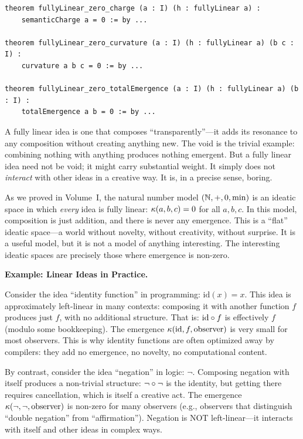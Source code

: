 \begin{lstlisting}[caption={Fully linear consequences (IDT\_v3\_Emergence.lean)}]
theorem fullyLinear_zero_charge (a : I) (h : fullyLinear a) :
    semanticCharge a = 0 := by ...

theorem fullyLinear_zero_curvature (a : I) (h : fullyLinear a) (b c : I) :
    curvature a b c = 0 := by ...

theorem fullyLinear_zero_totalEmergence (a : I) (h : fullyLinear a) (b : I) :
    totalEmergence a b = 0 := by ...
\end{lstlisting}

\begin{interpretation}
A fully linear idea is one that composes ``transparently''---it adds its resonance
to any composition without creating anything new. The void is the trivial example:
combining nothing with anything produces nothing emergent. But a fully linear idea
need not be void; it might carry substantial weight. It simply does not \emph{interact}
with other ideas in a creative way. It is, in a precise sense, boring.

As we proved in Volume~I, the natural number model $(\mathbb{N}, +, 0, \min)$ is an
ideatic space in which \emph{every} idea is fully linear: $\kappa(a,b,c) = 0$
for all $a, b, c$. In this model, composition is just addition, and there is
never any emergence. This is a ``flat'' ideatic space---a world without novelty,
without creativity, without surprise. It is a useful model, but it is not a
model of anything interesting. The interesting ideatic spaces are precisely
those where emergence is non-zero.

\textbf{Example: Linear Ideas in Practice.}

Consider the idea ``identity function'' in programming: $\text{id}(x) = x$.
This idea is approximately left-linear in many contexts: composing it with
another function $f$ produces just $f$, with no additional structure. That is:
$\text{id} \circ f$ is effectively $f$ (modulo some bookkeeping). The
emergence $\kappa(\text{id}, f, \text{observer})$ is very small for most
observers. This is why identity functions are often optimized away by compilers:
they add no emergence, no novelty, no computational content.

By contrast, consider the idea ``negation'' in logic: $\neg$. Composing negation
with itself produces a non-trivial structure: $\neg \circ \neg$ is the
identity, but getting there requires cancellation, which is itself a creative
act. The emergence $\kappa(\neg, \neg, \text{observer})$ is non-zero for
many observers (e.g., observers that distinguish ``double negation'' from
``affirmation''). Negation is NOT left-linear---it interacts with itself and
other ideas in complex ways.


\end{interpretation}
